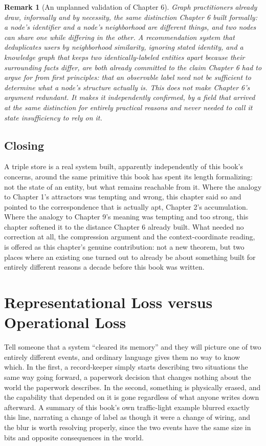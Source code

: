 \documentclass[11pt]{report}
\newtheorem{remark}{Remark}[chapter]
\begin{document}
\begin{remark}[An unplanned validation of Chapter 6]
Graph practitioners already draw, informally and by necessity, the
same distinction Chapter 6 built formally: a node's identifier and a
node's neighborhood are different things, and two nodes can share one
while differing in the other. A recommendation system that
deduplicates users by neighborhood similarity, ignoring stated
identity, and a knowledge graph that keeps two identically-labeled
entities apart because their surrounding facts differ, are both
already committed to the claim Chapter 6 had to argue for from first
principles: that an observable label need not be sufficient to
determine what a node's structure actually is. This does not make
Chapter 6's argument redundant. It makes it independently confirmed,
by a field that arrived at the same distinction for entirely practical
reasons and never needed to call it state insufficiency to rely on it.
\end{remark}

\section*{Closing}

A triple store is a real system built, apparently independently of
this book's concerns, around the same primitive this book has spent
its length formalizing: not the state of an entity, but what remains
reachable from it. Where the analogy to Chapter 1's attractors was
tempting and wrong, this chapter said so and pointed to the
correspondence that is actually apt, Chapter 2's accumulation. Where
the analogy to Chapter 9's meaning was tempting and too strong, this
chapter softened it to the distance Chapter 6 already built. What
needed no correction at all, the compression argument and the
context-coordinate reading, is offered as this chapter's genuine
contribution: not a new theorem, but two places where an existing one
turned out to already be about something built for entirely different
reasons a decade before this book was written.

\chapter{Representational Loss versus Operational Loss}

Tell someone that a system ``cleared its memory'' and they will
picture one of two entirely different events, and ordinary language
gives them no way to know which. In the first, a record-keeper simply
starts describing two situations the same way going forward, a
paperwork decision that changes nothing about the world the paperwork
describes. In the second, something is physically erased, and the
capability that depended on it is gone regardless of what anyone
writes down afterward. A summary of this book's own traffic-light
example blurred exactly this line, narrating a change of label as
though it were a change of wiring, and the blur is worth resolving
properly, since the two events have the same size in bits and
opposite consequences in the world.
\end{document}
